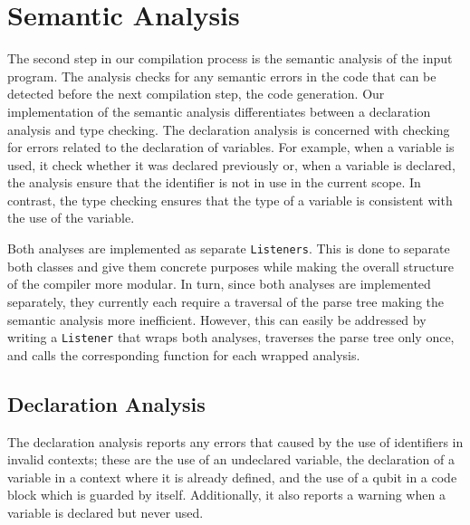 \section{Semantic Analysis}
\label{sec:implementation_semenaticAnalayis}
The second step in our compilation process is the semantic analysis of the input program. The analysis checks for any semantic errors in the code that can be detected before the next compilation step, the code generation. Our implementation of the semantic analysis differentiates between a declaration analysis and type checking. The declaration analysis is concerned with checking for errors related to the declaration of variables. For example, when a variable is used, it check whether it was declared previously or, when a variable is declared, the analysis ensure that the identifier is not in use in the current scope. In contrast, the type checking ensures that the type of a variable is consistent with the use of the variable. 

Both analyses are implemented as separate \texttt{Listeners}.
This is done to separate both classes and give them concrete purposes while making the overall structure of the compiler more modular. In turn, since both analyses are implemented separately, they currently each require a traversal of the parse tree making the semantic analysis more inefficient. However, this can easily be addressed by writing a \texttt{Listener} that wraps both analyses, traverses the parse tree only once, and calls the corresponding function for each wrapped analysis.     

\subsection{Declaration Analysis}
\label{sec:implementation_declarationAnalayis}
The declaration analysis reports any errors that caused by the use of identifiers in invalid contexts; these are the use of an undeclared variable, the declaration of a variable in a context where it is already defined, and the use of a qubit in a code block which is guarded by itself.
Additionally, it also reports a warning when a variable is declared but never used.

